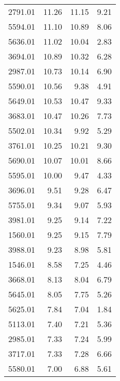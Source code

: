 \begin{table}
\begin{tabular}{rrrr}
2791.01 &            11.26 &            11.15 &             9.21 \\
5594.01 &            11.10 &            10.89 &             8.06 \\
5636.01 &            11.02 &            10.04 &             2.83 \\
3694.01 &            10.89 &            10.32 &             6.28 \\
2987.01 &            10.73 &            10.14 &             6.90 \\
5590.01 &            10.56 &             9.38 &             4.91 \\
5649.01 &            10.53 &            10.47 &             9.33 \\
3683.01 &            10.47 &            10.26 &             7.73 \\
5502.01 &            10.34 &             9.92 &             5.29 \\
3761.01 &            10.25 &            10.21 &             9.30 \\
5690.01 &            10.07 &            10.01 &             8.66 \\
5595.01 &            10.00 &             9.47 &             4.33 \\
3696.01 &             9.51 &             9.28 &             6.47 \\
5755.01 &             9.34 &             9.07 &             5.93 \\
3981.01 &             9.25 &             9.14 &             7.22 \\
1560.01 &             9.25 &             9.15 &             7.79 \\
3988.01 &             9.23 &             8.98 &             5.81 \\
1546.01 &             8.58 &             7.25 &             4.46 \\
3668.01 &             8.13 &             8.04 &             6.79 \\
5645.01 &             8.05 &             7.75 &             5.26 \\
5625.01 &             7.84 &             7.04 &             1.84 \\
5113.01 &             7.40 &             7.21 &             5.36 \\
2985.01 &             7.33 &             7.24 &             5.99 \\
3717.01 &             7.33 &             7.28 &             6.66 \\
5580.01 &             7.00 &             6.88 &             5.61 \\

\end{tabular}
\end{table}
